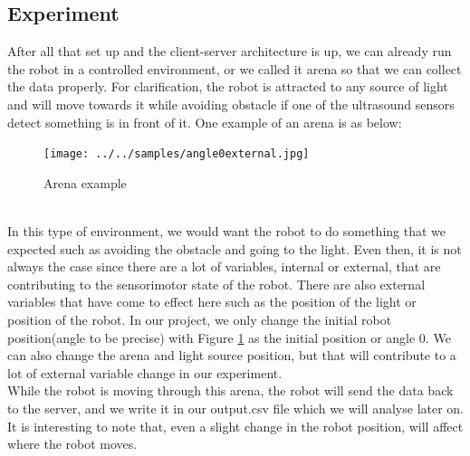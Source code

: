 \documentclass[a4paper]{article}
\begin{document}
\subsection{Experiment}
After all that set up and the client-server architecture is up, we can already run the robot in a controlled environment, or we called it arena so that we can collect the data properly. For clarification, the robot is attracted to any source of light and will move towards it while avoiding obstacle if one of the ultrasound sensors detect something is in front of it. One example of an arena is as below:
\begin{figure}[ht!]
	\centering
	\texttt{[image: ../../samples/angle0external.jpg]}
	\caption{Arena example}
	\label{arena}
\end{figure}
\\
In this type of environment, we would want the robot to do something that we expected such as avoiding the obstacle and going to the light. Even then, it is not always the case since there are a lot of variables, internal or external, that are contributing to the sensorimotor state of the robot. There are also external variables that have come to effect here such as the position of the light or position of the robot. In our project, we only change the initial robot position(angle to be precise) with Figure \ref{arena} as the initial position or angle 0. We can also change the arena and light source position, but that will contribute to a lot of external variable change in our experiment.
\\\newline
While the robot is moving through this arena, the robot will send the data back to the server, and we write it in our output.csv file which we will analyse later on. It is interesting to note that, even a slight change in the robot position, will affect where the robot moves. 
\end{document}
